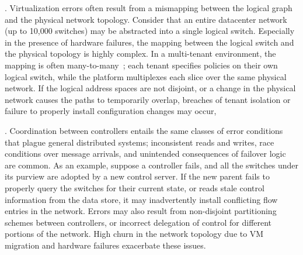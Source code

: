. Virtualization errors often result from a
mismapping between the logical
graph and the physical network topology. Consider that an entire datacenter
network (up to 10,000 switches) may be abstracted into a single logical switch. Especially in the
presence of hardware failures, the mapping between the logical switch and the
physical topology is highly complex. In a multi-tenant environment, the mapping is often
many-to-many~\cite{Casado:2010:VNF:1921151.1921162}; each tenant specifies
policies on their own logical switch, while the platform multiplexes each
slice over the same physical network. If the logical address
spaces are not disjoint, or a change in the physical network causes the paths
to temporarily overlap, breaches of tenant isolation or failure to properly
install configuration changes may occur,

. Coordination between controllers
entails the same classes of error
conditions that plague general distributed systems; inconsistent reads and
writes, race conditions over message arrivals, and unintended consequences of failover
logic are common. As an example, suppose a controller fails, and all the
switches under its purview are adopted by a new control server. If the new parent
fails to properly query the switches for their current state, or reads
stale control information from the data store, it may inadvertently install
conflicting flow entries in the network. Errors may also result 
from non-disjoint partitioning
schemes between controllers, or incorrect delegation of control for different
portions of the network. 
High churn in the network topology due to VM migration and
hardware failures exacerbate these issues.

